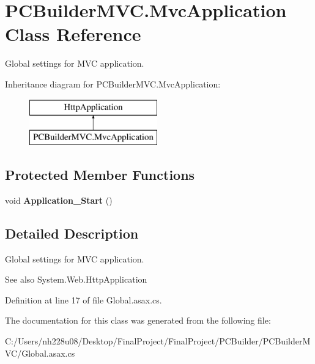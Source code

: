 \hypertarget{class_p_c_builder_m_v_c_1_1_mvc_application}{}\section{P\+C\+Builder\+M\+V\+C.\+Mvc\+Application Class Reference}
\label{class_p_c_builder_m_v_c_1_1_mvc_application}


Global settings for M\+VC application.  


Inheritance diagram for P\+C\+Builder\+M\+V\+C.\+Mvc\+Application\+:\begin{figure}[H]
\begin{center}
\leavevmode
\includegraphics[height=2.000000cm]{class_p_c_builder_m_v_c_1_1_mvc_application}
\end{center}
\end{figure}
\subsection*{Protected Member Functions}
\begin{DoxyCompactItemize}
\item 
void {\bfseries Application\+\_\+\+Start} ()\hypertarget{class_p_c_builder_m_v_c_1_1_mvc_application_a79dbe3343b39de1768ebf8c9279ed6e7}{}\label{class_p_c_builder_m_v_c_1_1_mvc_application_a79dbe3343b39de1768ebf8c9279ed6e7}

\end{DoxyCompactItemize}


\subsection{Detailed Description}
Global settings for M\+VC application. 

\begin{DoxySeeAlso}{See also}
System.\+Web.\+Http\+Application


\end{DoxySeeAlso}


Definition at line 17 of file Global.\+asax.\+cs.



The documentation for this class was generated from the following file\+:\begin{DoxyCompactItemize}
\item 
C\+:/\+Users/nh228u08/\+Desktop/\+Final\+Project/\+Final\+Project/\+P\+C\+Builder/\+P\+C\+Builder\+M\+V\+C/Global.\+asax.\+cs\end{DoxyCompactItemize}
